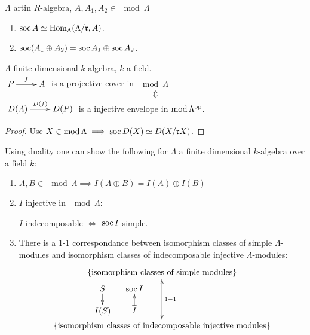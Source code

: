 \begin{exer}
$\Lambda$ artin $R$-algebra, $A, A_1, A_2 \in \mod\Lambda$
\begin{enumerate}[\rm(a)]
\item $\operatorname{soc} A \simeq \operatorname{Hom}_\Lambda(\Lambda/\mathfrak{r}, A)$.
\item $\operatorname{soc}(A_1 \oplus A_2) = \operatorname{soc} A_1 \oplus \operatorname{soc} A_2$.
\end{enumerate}
\end{exer}

\begin{prop}
\label{prop:57}
$\Lambda$ finite dimensional $k$-algebra, $k$ a field.\\
$\xymatrix{P \ar[r]^f & A}$ is a projective cover in
$\mod\Lambda$ \[\Updownarrow\] $\xymatrix{D(A) \ar[r]^{D(f)} & D(P)}$
is a injective envelope in $\operatorname{mod}\nolimits\Lambda^{{\operatorname{op}\nolimits}}$.  
\end{prop}
\begin{proof}
Use $X \in \operatorname{mod}\nolimits\Lambda \implies \operatorname{soc} D(X) \simeq D(X/\mathfrak{r}X)$. 
\end{proof}

Using duality one can show the following for $\Lambda$ a finite dimensional
$k$-algebra over a field $k$:
\begin{enumerate}[\rm(a)]
\item $A,B \in \mod\Lambda \implies I(A\oplus B) = I(A) \oplus I(B)$
\item $I$ injective in $\mod\Lambda$:\\
\centerline{$I$ indecomposable $\iff$ $\operatorname{soc} I$ simple.}
\item There is a 1-1 correspondance between isomorphism classes
  of simple $\Lambda$-modules and isomorphism classes of
  indecomposable injective $\Lambda$-modules: 
\[\xy

\POS(-25,0)
\xymatrix@C-1pc@R-1pc{
S \ar@{|->}[d] & \soc I \ar@{<-|}[d]\\
I(S) & I
}

\POS(0, 7)

\xymatrix@R+3pc{
\{ \text{isomorphism classes of simple modules} \} \ar@{<->}[d]^{1-1}\\
\{ \text{isomorphism classes of indecomposable injective modules} \}
}

\endxy\]
\end{enumerate}


